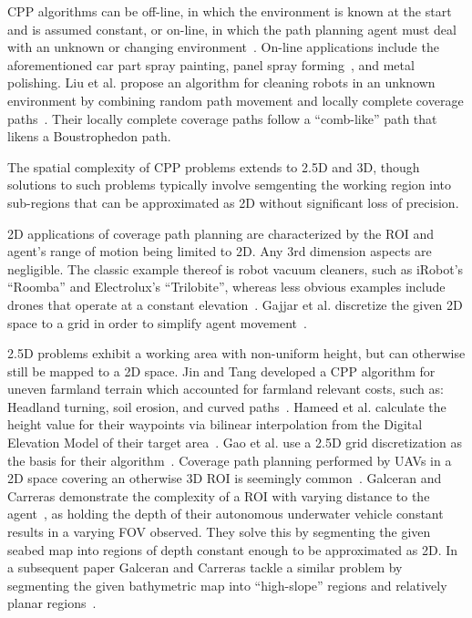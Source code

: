 CPP algorithms can be off-line, in which the environment is known at the start and is assumed constant, or on-line, in which the path planning agent must deal with an unknown or changing environment~\cite{CPP_survey_for_robotics}.
On-line applications include the aforementioned car part spray painting, panel spray forming~\cite{Robotic_grc_spraying}, and metal polishing.
Liu et al. propose an algorithm for cleaning robots in an unknown environment by combining random path movement and locally complete coverage paths~\cite{CCPP_cleaning_robots}.
Their locally complete coverage paths follow a ``comb-like'' path that likens a Boustrophedon path.

The spatial complexity of CPP problems extends to 2.5D and 3D, though solutions to such problems typically involve semgenting the working region into sub-regions that can be approximated as 2D without significant loss of precision.

2D applications of coverage path planning are characterized by the ROI and agent's range of motion being limited to 2D.
Any 3rd dimension aspects are negligible.
The classic example thereof is robot vacuum cleaners, such as iRobot's ``Roomba'' and Electrolux's ``Trilobite''\cite{CCPP_cleaning_robots}, whereas less obvious examples include drones that operate at a constant elevation~\cite{CPP_2D_convex_regions_uav}.
Gajjar et al. discretize the given 2D space to a grid in order to simplify agent movement~\cite{CCPP_known_2D_env}.

2.5D problems exhibit a working area with non-uniform height, but can otherwise still be mapped to a 2D space.
Jin and Tang developed a CPP algorithm for uneven farmland terrain which accounted for farmland relevant costs, such as: Headland turning, soil erosion, and curved paths~\cite{CPP_farming_terrain}.
Hameed et al. calculate the height value for their waypoints via bilinear interpolation from the Digital Elevation Model of their target area~\cite{CPP_2.5D_agriculture}.
Gao et al. use a 2.5D grid discretization as the basis for their algorithm~\cite{CPP_2.5D_grid_map}.
Coverage path planning performed by UAVs in a 2D space covering an otherwise 3D ROI is seemingly common~\cite{CPP_2.5D_SAA_grid_based_UAV_3D_recons, CPP_2.5D_UAV_3D_terrain_recons, CPP_multi_UAV, CPP_2D_convex_regions_uav}.
Galceran and Carreras demonstrate the complexity of a ROI with varying distance to the agent~\cite{CPP_2.5D_seabed_2012}, as holding the depth of their autonomous underwater vehicle constant results in a varying FOV observed.
They solve this by segmenting the given seabed map into regions of depth constant enough to be approximated as 2D.
In a subsequent paper Galceran and Carreras tackle a similar problem by segmenting the given bathymetric map into ``high-slope'' regions and relatively planar regions~\cite{CPP_2.5D_seabed_2013}.

